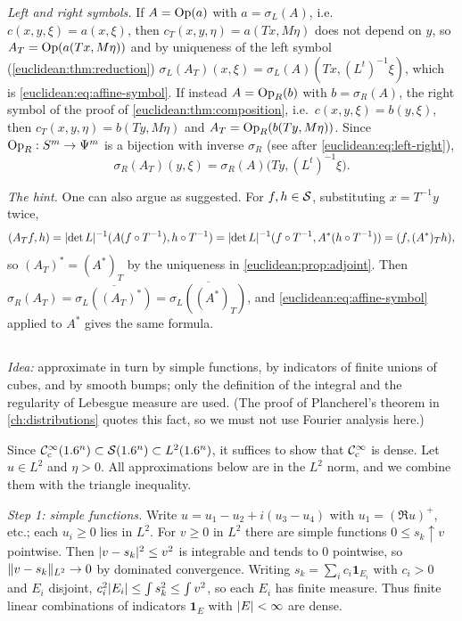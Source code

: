 \emph{Left and right symbols.} If $A=\operatorname{Op}(a)$ with $a=\sigma_L(A)$, i.e.\ $c(x,y,\xi)=a(x,\xi)$,
then $c_T(x,y,\eta)=a(Tx,M\eta)$ does not depend on $y$, so $A_T=\operatorname{Op}(a(Tx,M\eta))$ and by
uniqueness of the left symbol (\cref{euclidean:thm:reduction})
$\sigma_L(A_T)(x,\xi)=\sigma_L(A)(Tx,(L^t)^{-1}\xi)$, which is
\eqref{euclidean:eq:affine-symbol}. If instead $A=\operatorname{Op}_R(b)$ with $b=\sigma_R(A)$, the right
symbol of the proof of \cref{euclidean:thm:composition}, i.e.\ $c(x,y,\xi)=b(y,\xi)$, then
$c_T(x,y,\eta)=b(Ty,M\eta)$ and $A_T=\operatorname{Op}_R(b(Ty,M\eta))$. Since
$\operatorname{Op}_R:S^m\to\Psi^{m}$ is a bijection with inverse $\sigma_R$ (see after
\eqref{euclidean:eq:left-right}),
\begin{equation*}
  \sigma_R(A_T)(y,\xi)=\sigma_R(A)\bigl(Ty,(L^t)^{-1}\xi\bigr).
\end{equation*}

\emph{The hint.} One can also argue as suggested. For $f,h\in\mathcal{S}$, substituting
$x=T^{-1}y$ twice,
\begin{equation*}
  ( A_Tf, h)=\lvert \det L\rvert^{-1}( A(f\circ T^{-1}), h\circ T^{-1})
  =\lvert \det L\rvert^{-1}( f\circ T^{-1}, A^*(h\circ T^{-1}))=( f, (A^*)_Th),
\end{equation*}
so $(A_T)^*=(A^*)_T$ by the uniqueness in \cref{euclidean:prop:adjoint}. Then
$\sigma_R(A_T)=\overline{\sigma_L((A_T)^*)}=\overline{\sigma_L((A^*)_T)}$, and
\eqref{euclidean:eq:affine-symbol} applied to $A^*$ gives the same formula.

\subsection*{}

\emph{Idea:} approximate in turn by simple functions, by indicators of finite unions of
cubes, and by smooth bumps; only the definition of the integral and the regularity of
Lebesgue measure are used. (The proof of Plancherel's theorem in \cref{ch:distributions}
quotes this fact, so we must not use Fourier analysis here.)

Since $\mathcal{C}^\infty_{\mathrm{c}}(1.6^n)\subset\mathcal{S}(1.6^n)\subset L^2(1.6^n)$, it suffices to show that $\mathcal{C}^\infty_{\mathrm{c}}$ is
dense. Let $u\in L^2$ and $\eta>0$. All approximations below are in the $L^2$ norm, and we
combine them with the triangle inequality.

\emph{Step 1: simple functions.} Write $u=u_1-u_2+i(u_3-u_4)$ with
$u_1=(\Re u)^+$, etc.; each $u_i\ge0$ lies in $L^2$. For $v\ge0$ in $L^2$ there are simple
functions $0\le s_k\uparrow v$ pointwise. Then $\lvert v-s_k\rvert^2\le v^2$ is integrable and
tends to $0$ pointwise, so $\lVert v-s_k\rVert_{L^2}\to0$ by dominated convergence. Writing
$s_k=\sum_ic_i\mathbf 1_{E_i}$ with $c_i>0$ and $E_i$ disjoint,
$c_i^2\lvert E_i\rvert\le\int s_k^2\le\int v^2$, so each $E_i$ has finite measure. Thus finite
linear combinations of indicators $\mathbf 1_E$ with $\lvert E\rvert<\infty$ are dense.

